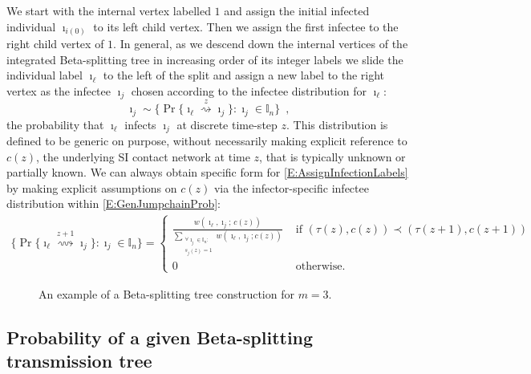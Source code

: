 \documentclass[review]{elsarticle}
\numberwithin{equation}{section}
\let\orgautoref\autoref
\renewcommand{\autoref}
        {\def\equationautorefname{Eq.}%
         \def\figureautorefname{Fig.}%
         \def\subfigureautorefname{Fig.}%
         \def\sectionautorefname{Sect.}%
         \def\subsectionautorefname{Sect.}%
         \def\subsubsectionautorefname{Sect.}%
         \def\Itemautorefname{item}%
         \def\tableautorefname{Table}%
         \def\propositionautorefname{Prop.}%
         \def\corollaryautorefname{Corollary}%
         \def\theoremautorefname{Theorem}%
         \def\remarkautorefname{Remark}%
         \def\lemmaautorefname{Lemma}%
         \def\proofofautorefname{Proof}%
         \def\exampleautorefname{Example}%
         \orgautoref}
\newcommand{\bI}{{\mathbb I}}
\begin{document}
We start with the internal vertex labelled $1$ and assign the initial infected individual $\imath_{i(0)}$ to its left child vertex. 
Then we assign the first infectee to the right child vertex of $1$.  
In general, as we descend down the internal vertices of the integrated Beta-splitting tree in increasing order of its integer labels we slide the individual label $\imath_{\ell}$ to the left 
of the split and assign a new label to the right vertex as the infectee $\imath_j$ chosen according to the infectee distribution for $\imath_{\ell}$: 
\begin{equation}\label{E:AssignInfectionLabels}
\imath_j \sim \{\Pr\{\imath_{\ell} \overset{z}{\rightsquigarrow} \imath_j \}:  \imath_j \in \bI_n \} \enspace,
\end{equation}
the probability that $\imath_{\ell}$ infects $\imath_j$ at discrete time-step $z$.
This distribution is defined to be generic on purpose, without necessarily making explicit reference to $c(z)$, 
the underlying SI contact network at time $z$, that is typically unknown or partially known.  
We can always obtain specific form for \autoref{E:AssignInfectionLabels} by making explicit assumptions on $c(z)$ via the infector-specific infectee distribution within \autoref{E:GenJumpchainProb}:
\begin{multline}\label{E:AssignInfectionLabelsExplicit}
\{\Pr\{\imath_{\ell} \overset{z+1}{\rightsquigarrow} \imath_j \}:  \imath_j \in \bI_n \}
=
\begin{cases}
\frac{w(\imath_{\ell},\imath_j;\, c(z))}
{\sum\limits_{\substack{\forall \imath_j \in \bI_n :\\ s_j(z)=1}}
w(\imath_{\ell},\imath_j ; c(z))}
& \text{ if } (\tau(z),c(z)) \prec (\tau(z+1),c(z+1))\\
0 & \text{ otherwise}.
\end{cases}
\end{multline}


\begin{figure}[t]
\begin{center}
%

\caption{\label{example1}An example of a Beta-splitting tree construction for $m=3$.}
\end{center}
\end{figure}


\subsection{Probability of a given Beta-splitting transmission tree}
\end{document}

